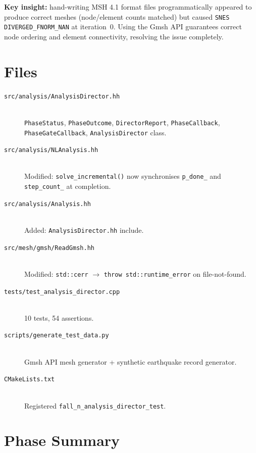 \textbf{Key insight:} hand-writing MSH 4.1 format files
programmatically appeared to produce correct meshes (node/element counts
matched) but caused \texttt{SNES DIVERGED\_FNORM\_NAN} at iteration~0.
Using the Gmsh API guarantees correct node ordering and element
connectivity, resolving the issue completely.


\section{Files}

\begin{description}
  \item[\texttt{src/analysis/AnalysisDirector.hh}] \hfill \\
    \texttt{PhaseStatus}, \texttt{PhaseOutcome}, \texttt{DirectorReport},
    \texttt{PhaseCallback}, \texttt{PhaseGateCallback},
    \texttt{AnalysisDirector} class.

  \item[\texttt{src/analysis/NLAnalysis.hh}] \hfill \\
    Modified: \texttt{solve\_incremental()} now synchronises
    \texttt{p\_done\_} and \texttt{step\_count\_} at completion.

  \item[\texttt{src/analysis/Analysis.hh}] \hfill \\
    Added: \texttt{AnalysisDirector.hh} include.

  \item[\texttt{src/mesh/gmsh/ReadGmsh.hh}] \hfill \\
    Modified: \texttt{std::cerr} $\to$ \texttt{throw std::runtime\_error}
    on file-not-found.

  \item[\texttt{tests/test\_analysis\_director.cpp}] \hfill \\
    10 tests, 54 assertions.

  \item[\texttt{scripts/generate\_test\_data.py}] \hfill \\
    Gmsh API mesh generator + synthetic earthquake record generator.

  \item[\texttt{CMakeLists.txt}] \hfill \\
    Registered \texttt{fall\_n\_analysis\_director\_test}.
\end{description}


\section{Phase Summary}

